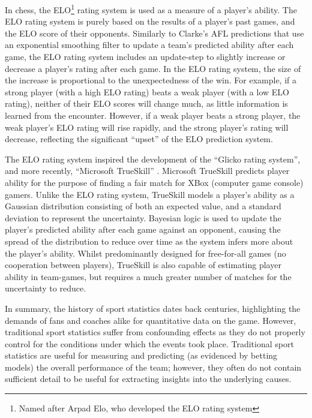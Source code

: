 In chess, the ELO\footnote{Named after Arpad Elo, who developed the ELO rating system} rating system is used as a measure of a player's
ability. The ELO rating system is purely based on the results of a
player's past games, and the ELO score of their opponents. Similarly to
Clarke's AFL predictions that use an exponential smoothing filter to
update a team's predicted ability after each game, the ELO rating system
includes an update-step to slightly increase or decrease a player's
rating after each game. In the ELO rating system, the size of the
increase is proportional to the unexpectedness of the win. For example,
if a strong player (with a high ELO rating) beats a weak player (with a
low ELO rating), neither of their ELO scores will change much, as little
information is learned from the encounter. However, if a weak player
beats a strong player, the weak player's ELO rating will rise rapidly,
and the strong player's rating will decrease, reflecting the significant
``upset'' of the ELO prediction system.

The ELO rating system inspired the development of the ``Glicko rating
system'', and more recently, ``Microsoft TrueSkill''
\cite{herbrich_trueskill_2007}. Microsoft TrueSkill predicts player
ability for the purpose of finding a fair match for XBox (computer game
console) gamers. Unlike the ELO rating system, TrueSkill models a
player's ability as a Gaussian distribution consisting of both an
expected value, and a standard deviation to represent the uncertainty.
Bayesian logic is used to update the player's predicted ability after
each game against an opponent, causing the spread of the distribution to
reduce over time as the system infers more about the player's ability.
Whilst predominantly designed for free-for-all games (no cooperation
between players), TrueSkill is also capable of estimating player ability
in team-games, but requires a much greater number of matches for the
uncertainty to reduce.

In summary, the history of sport statistics dates back centuries,
highlighting the demands of fans and coaches alike for quantitative data
on the game. However, traditional sport statistics suffer from
confounding effects as they do not properly control for the conditions
under which the events took place. Traditional sport statistics are
useful for measuring and predicting (as evidenced by betting models) the
overall performance of the team; however, they often do not contain
sufficient detail to be useful for extracting insights into the
underlying causes.

